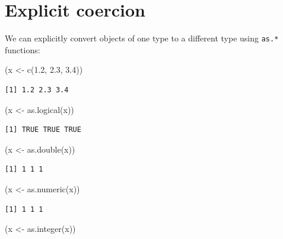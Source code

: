 \documentclass[
]{book}
\newenvironment{Shaded}{\begin{snugshade}}{\end{snugshade}}
\newcommand{\FloatTok}[1]{\textcolor[rgb]{0.00,0.00,0.81}{#1}}
\newcommand{\FunctionTok}[1]{\textcolor[rgb]{0.00,0.00,0.00}{#1}}
\newcommand{\NormalTok}[1]{#1}
\newcommand{\OtherTok}[1]{\textcolor[rgb]{0.56,0.35,0.01}{#1}}
\begin{document}
\hypertarget{explicit-coercion}{%
\section{Explicit coercion}\label{explicit-coercion}}

We can explicitly convert objects of one type to a different type using \texttt{as.*} functions:

\begin{Shaded}
\begin{Highlighting}[]
\NormalTok{(x }\OtherTok{\textless{}{-}} \FunctionTok{c}\NormalTok{(}\FloatTok{1.2}\NormalTok{, }\FloatTok{2.3}\NormalTok{, }\FloatTok{3.4}\NormalTok{))}
\end{Highlighting}
\end{Shaded}

\begin{verbatim}
[1] 1.2 2.3 3.4
\end{verbatim}

\begin{Shaded}
\begin{Highlighting}[]
\NormalTok{(x }\OtherTok{\textless{}{-}} \FunctionTok{as.logical}\NormalTok{(x))}
\end{Highlighting}
\end{Shaded}

\begin{verbatim}
[1] TRUE TRUE TRUE
\end{verbatim}

\begin{Shaded}
\begin{Highlighting}[]
\NormalTok{(x }\OtherTok{\textless{}{-}} \FunctionTok{as.double}\NormalTok{(x))}
\end{Highlighting}
\end{Shaded}

\begin{verbatim}
[1] 1 1 1
\end{verbatim}

\begin{Shaded}
\begin{Highlighting}[]
\NormalTok{(x }\OtherTok{\textless{}{-}} \FunctionTok{as.numeric}\NormalTok{(x))}
\end{Highlighting}
\end{Shaded}

\begin{verbatim}
[1] 1 1 1
\end{verbatim}

\begin{Shaded}
\begin{Highlighting}[]
\NormalTok{(x }\OtherTok{\textless{}{-}} \FunctionTok{as.integer}\NormalTok{(x))}
\end{Highlighting}
\end{Shaded}
\end{document}
